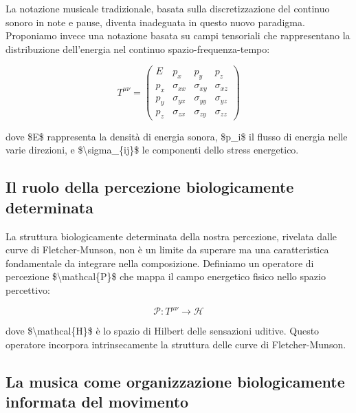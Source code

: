\documentclass[a4paper,11pt]{article}
\begin{document}
La notazione musicale tradizionale, basata sulla discretizzazione del
continuo sonoro in note e pause, diventa inadeguata in questo nuovo
paradigma. Proponiamo invece una notazione basata su campi tensoriali
che rappresentano la distribuzione dell'energia nel continuo
spazio-frequenza-tempo:

\begin{displaymath}
T^{\mu\nu} = \begin{pmatrix}
E & p_x & p_y & p_z \\
p_x & \sigma_{xx} & \sigma_{xy} & \sigma_{xz} \\
p_y & \sigma_{yx} & \sigma_{yy} & \sigma_{yz} \\
p_z & \sigma_{zx} & \sigma_{zy} & \sigma_{zz}
\end{pmatrix}
\end{displaymath}

dove \$E\$ rappresenta la densità di energia sonora, \$p\_i\$ il flusso di
energia nelle varie direzioni, e \$\textbackslash{}sigma\_\{ij\}\$ le componenti dello
stress energetico.

\subsection{Il ruolo della percezione biologicamente determinata}\hypertarget{il-ruolo-della-percezione-biologicamente-determinata}{}\label{il-ruolo-della-percezione-biologicamente-determinata}

La struttura biologicamente determinata della nostra percezione,
rivelata dalle curve di Fletcher-Munson, non è un limite da superare ma
una caratteristica fondamentale da integrare nella composizione.
Definiamo un operatore di percezione \$\textbackslash{}mathcal\{P\}\$ che mappa il campo
energetico fisico nello spazio percettivo:

\begin{displaymath}
\mathcal{P}: T^{\mu\nu} \rightarrow \mathcal{H}
\end{displaymath}

dove \$\textbackslash{}mathcal\{H\}\$ è lo spazio di Hilbert delle sensazioni uditive.
Questo operatore incorpora intrinsecamente la struttura delle curve di
Fletcher-Munson.

\subsection{La musica come organizzazione biologicamente informata del movimento}\hypertarget{la-musica-come-organizzazione-biologicamente-informata-del-movimento}{}\label{la-musica-come-organizzazione-biologicamente-informata-del-movimento}
\end{document}
